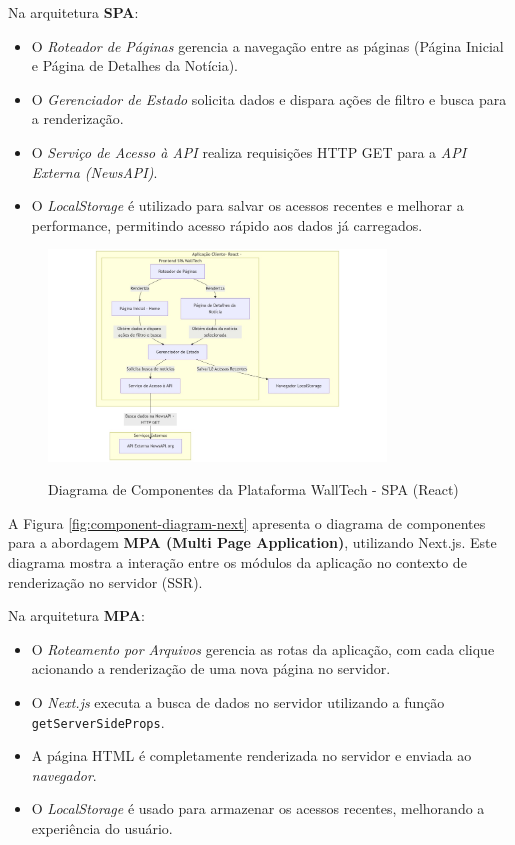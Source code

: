 Na arquitetura \textbf{SPA}:
\begin{itemize}
    \item O \textit{Roteador de Páginas} gerencia a navegação entre as páginas (Página Inicial e Página de Detalhes da Notícia).
    \item O \textit{Gerenciador de Estado} solicita dados e dispara ações de filtro e busca para a renderização.
    \item O \textit{Serviço de Acesso à API} realiza requisições HTTP GET para a \textit{API Externa (NewsAPI)}.
    \item O \textit{LocalStorage} é utilizado para salvar os acessos recentes e melhorar a performance, permitindo acesso rápido aos dados já carregados.
\end{itemize}

\begin{figure}[H]
  \centering
  \caption{Diagrama de Componentes da Plataforma WallTech - SPA (React)}
  \includegraphics[width=0.8\textwidth]{media/component-diagram-react.jpeg}
  \label{fig:component-diagram-react}
\end{figure}

A Figura \ref{fig:component-diagram-next} apresenta o diagrama de componentes para a abordagem \textbf{MPA (Multi Page Application)}, utilizando Next.js. Este diagrama mostra a interação entre os módulos da aplicação no contexto de renderização no servidor (SSR).

Na arquitetura \textbf{MPA}:
\begin{itemize}
    \item O \textit{Roteamento por Arquivos} gerencia as rotas da aplicação, com cada clique acionando a renderização de uma nova página no servidor.
    \item O \textit{Next.js} executa a busca de dados no servidor utilizando a função \texttt{getServerSideProps}.
    \item A página HTML é completamente renderizada no servidor e enviada ao \textit{navegador}.
    \item O \textit{LocalStorage} é usado para armazenar os acessos recentes, melhorando a experiência do usuário.
\end{itemize}


